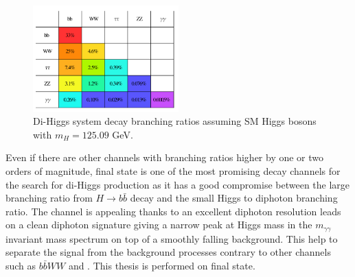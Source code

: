 \begin{figure}[htbp]
    \centering
    \includegraphics[width=0.5\textwidth]{Ch1/Img/HH_decays.png}
    \caption{Di-Higgs system decay branching ratios assuming SM Higgs bosons with $m_H=125.09$ GeV.}
    \label{fig:chap1:HH:HPD:DCY}
\end{figure}
Even if there are other channels with branching ratios higher by one or two orders of magnitude, \bbyy final state is one of the most promising decay channels for the search for di-Higgs production as it has a good compromise between the large branching ratio from $H\to b\bar{b}$ decay and the small Higgs to diphoton branching ratio. The \bbyy channel is appealing thanks to an excellent diphoton resolution leads on a clean diphoton signature giving a narrow peak at Higgs mass in the $m_{\gamma\gamma}$ invariant mass spectrum on top of a smoothly falling background. This help to separate the signal from the background processes contrary to other channels such as \bbbb $b\bar{b}WW$ and \bbtt. This thesis is performed on \bbyy final state.

